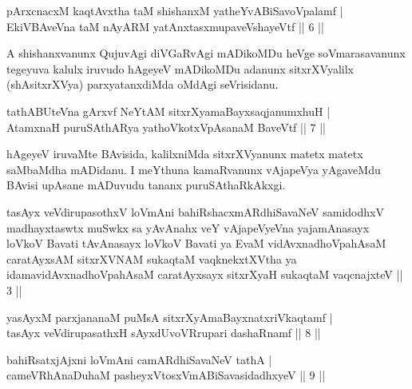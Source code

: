 
\begin{shl}
pArxcnacxM kaqtAvx\s tha taM shishanxM yatheYvABiSavoVpalamf | \\
EkiVBAveVna taM nAyARM yatAnxtasxmupaveVshayeVtf \hfill|| 6 || 
\end{shl}

\begin{artha}
A shishanxvanunx QujuvAgi diVGaRvAgi mADikoMDu heVge soVmarasavanunx 
tegeyuva kalulx iruvudo hAgeyeV mADikoMDu adanunx sitxrXVyalilx 
(shAsitxrXVya) parxyatanxdiMda oMdAgi seVrisidanu.
\end{artha}


\begin{shl}
tathABUteVna gArxvf NeYtAM sitxrXyamaBayxsaqjanumxhuH | \\
AtamxnaH puruSAthARya yathoVkotxVpAsanaM BaveVtf \hfill|| 7 || 
\end{shl}

\begin{artha}
hAgeyeV iruvaMte BAvisida, kalilxniMda sitxrXVyanunx matetx matetx 
saMbaMdha mADidanu. I meYthuna kamaRvanunx vAjapeVya yAgaveMdu BAvisi 
upAsane mADuvudu tananx puruSAthaRkAkxgi.
\end{artha}


\begin{kandikeshl}
tasAyx veVdirupasothxV loVmAni bahiRshacxmARdhiSavaNeV samidodhxV madhayxtaswtx muSwkx sa yAvAnahx veY vAjapeVyeVna yajamAnasayx loVkoV Bavati tAvAnasayx loVkoV Bavati ya EvaM vidAvxnadhoVpahAsaM caratAyxsAM sitxrXVNAM sukaqtaM vaqknekxtXV\s tha ya idamavidAvxnadhoVpahAsaM caratAyxsayx sitxrXyaH sukaqtaM vaqcnajxteV || 3 ||
\end{kandikeshl}

\begin{shl}
yasAyxM  parxjananaM puMsA sitxrXyAmaBayxnatxriVkaqtamf | \\
tasAyx veVdirupasathxH sAyxdUvoVRrupari dashaRnamf \hfill|| 8 || 
\end{shl}

\begin{shl}
bahiRsatxjAjxni loVmAni camARdhiSavaNeV tathA | \\
cameVRhA\s \s naDuhaM pasheyxVtosxVmABiSavasidadhxyeV \hfill|| 9 || 
\end{shl}


